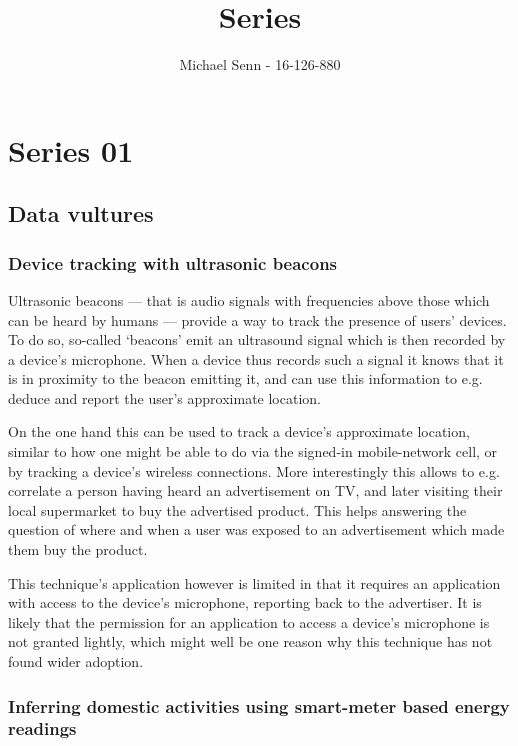 \documentclass[a4paper]{scrreprt}
\title{Series \series}
\author{Michael Senn \maillink{michael.senn@students.unibe.ch} - 16-126-880}
\date{\printdate}
\newcommand{\series}{01}
\begin{document}
\maketitle


\setcounter{chapter}{\numexpr \series - 1 \relax}

\chapter{Series \series}

\section{Data vultures}

\subsection{Device tracking with ultrasonic beacons}

Ultrasonic beacons --- that is audio signals with frequencies above those which
can be heard by humans --- provide a way to track the presence of users'
devices. To do so, so-called `beacons' emit an ultrasound signal which is then
recorded by a device's microphone. When a device thus records such a signal it
knows that it is in proximity to the beacon emitting it, and can use this
information to e.g. deduce and report the user's approximate
location.\autocite{newmanHowBlockUltrasonic2016}

On the one hand this can be used to track a device's approximate location,
similar to how one might be able to do via the signed-in mobile-network cell,
or by tracking a device's wireless connections. More interestingly this allows
to e.g. correlate a person having heard an advertisement on TV, and later
visiting their local supermarket to buy the advertised product. This helps
answering the question of where and when a user was exposed to an advertisement
which made them buy the product.\autocite{fribergUltrasonicBeaconsSilent2017}

This technique's application however is limited in that it requires an
application with access to the device's microphone, reporting back to the
advertiser. It is likely that the permission for an application to access a
device's microphone is not granted lightly, which might well be one reason why
this technique has not found wider adoption.

\subsection{Inferring domestic activities using smart-meter based energy readings}
\end{document}
